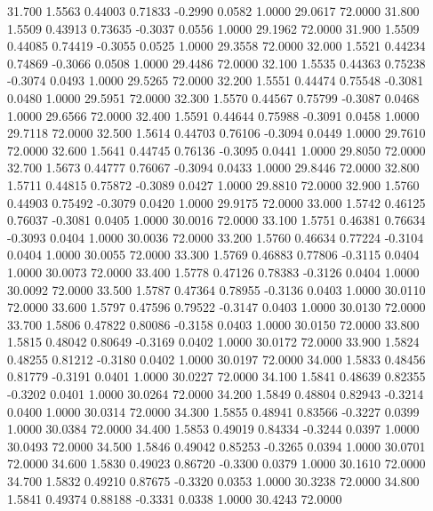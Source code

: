   31.700   1.5563   0.44003   0.71833  -0.2990   0.0582   1.0000  29.0617  72.0000
  31.800   1.5509   0.43913   0.73635  -0.3037   0.0556   1.0000  29.1962  72.0000
  31.900   1.5509   0.44085   0.74419  -0.3055   0.0525   1.0000  29.3558  72.0000
  32.000   1.5521   0.44234   0.74869  -0.3066   0.0508   1.0000  29.4486  72.0000
  32.100   1.5535   0.44363   0.75238  -0.3074   0.0493   1.0000  29.5265  72.0000
  32.200   1.5551   0.44474   0.75548  -0.3081   0.0480   1.0000  29.5951  72.0000
  32.300   1.5570   0.44567   0.75799  -0.3087   0.0468   1.0000  29.6566  72.0000
  32.400   1.5591   0.44644   0.75988  -0.3091   0.0458   1.0000  29.7118  72.0000
  32.500   1.5614   0.44703   0.76106  -0.3094   0.0449   1.0000  29.7610  72.0000
  32.600   1.5641   0.44745   0.76136  -0.3095   0.0441   1.0000  29.8050  72.0000
  32.700   1.5673   0.44777   0.76067  -0.3094   0.0433   1.0000  29.8446  72.0000
  32.800   1.5711   0.44815   0.75872  -0.3089   0.0427   1.0000  29.8810  72.0000
  32.900   1.5760   0.44903   0.75492  -0.3079   0.0420   1.0000  29.9175  72.0000
  33.000   1.5742   0.46125   0.76037  -0.3081   0.0405   1.0000  30.0016  72.0000
  33.100   1.5751   0.46381   0.76634  -0.3093   0.0404   1.0000  30.0036  72.0000
  33.200   1.5760   0.46634   0.77224  -0.3104   0.0404   1.0000  30.0055  72.0000
  33.300   1.5769   0.46883   0.77806  -0.3115   0.0404   1.0000  30.0073  72.0000
  33.400   1.5778   0.47126   0.78383  -0.3126   0.0404   1.0000  30.0092  72.0000
  33.500   1.5787   0.47364   0.78955  -0.3136   0.0403   1.0000  30.0110  72.0000
  33.600   1.5797   0.47596   0.79522  -0.3147   0.0403   1.0000  30.0130  72.0000
  33.700   1.5806   0.47822   0.80086  -0.3158   0.0403   1.0000  30.0150  72.0000
  33.800   1.5815   0.48042   0.80649  -0.3169   0.0402   1.0000  30.0172  72.0000
  33.900   1.5824   0.48255   0.81212  -0.3180   0.0402   1.0000  30.0197  72.0000
  34.000   1.5833   0.48456   0.81779  -0.3191   0.0401   1.0000  30.0227  72.0000
  34.100   1.5841   0.48639   0.82355  -0.3202   0.0401   1.0000  30.0264  72.0000
  34.200   1.5849   0.48804   0.82943  -0.3214   0.0400   1.0000  30.0314  72.0000
  34.300   1.5855   0.48941   0.83566  -0.3227   0.0399   1.0000  30.0384  72.0000
  34.400   1.5853   0.49019   0.84334  -0.3244   0.0397   1.0000  30.0493  72.0000
  34.500   1.5846   0.49042   0.85253  -0.3265   0.0394   1.0000  30.0701  72.0000
  34.600   1.5830   0.49023   0.86720  -0.3300   0.0379   1.0000  30.1610  72.0000
  34.700   1.5832   0.49210   0.87675  -0.3320   0.0353   1.0000  30.3238  72.0000
  34.800   1.5841   0.49374   0.88188  -0.3331   0.0338   1.0000  30.4243  72.0000
